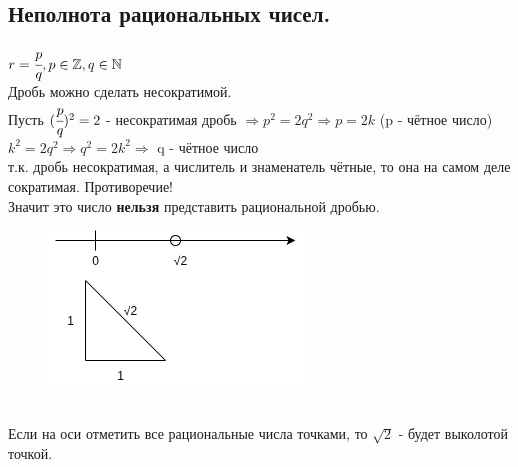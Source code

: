 \documentclass[12pt, paper]{article}
\newcommand{\N}{\mathbb{N}}
\newcommand{\Z}{\mathbb{Z}}
\begin{document}
\subsection*{Неполнота рациональных чисел.}
$r = \cfrac{p}{q},p\in \Z,q\in\N $\\
Дробь можно сделать несократимой.\\
Пусть $(\cfrac{p}{q})^2 = 2$ - несократимая дробь $\Rightarrow p^2 = 2q^2 \Rightarrow p = 2k$ (p - чётное число) \\
$k^2 = 2q^2 \Rightarrow q^2 = 2k^2 \Rightarrow $ q - чётное число
\\т.к. дробь несократимая, а числитель и знаменатель чётные, то она на самом деле сократимая. Противоречие! \\
Значит это число \textbf{нельзя} представить рациональной дробью.
\begin{figure}[h]
    \includegraphics[width=0.2\linewidth]{images/Дедекиндовы сечения/Начало дедекиндовых сечений.png}
\end{figure}\\
Если на оси отметить все рациональные числа точками, то $\sqrt{2}$ - будет выколотой точкой.
\end{document}
